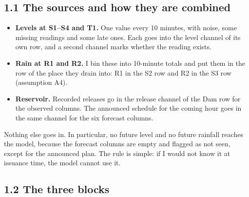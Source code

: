 \documentclass[11pt,letterpaper]{article}
\begin{document}
\subsection*{1.1 The sources and how they are combined}

\begin{itemize}
\item \textbf{Levels at S1--S4 and T1.} One value every 10 minutes, with noise,
some missing readings and some late ones. Each goes into the level channel of its
own row, and a second channel marks whether the reading exists.
\item \textbf{Rain at R1 and R2.} I bin these into 10-minute totals and put them
in the row of the place they drain into: R1 in the S2 row and R2 in the S3 row
(assumption A4).
\item \textbf{Reservoir.} Recorded releases go in the release channel of the Dam
row for the observed columns. The announced schedule for the coming hour goes in
the same channel for the six forecast columns.
\end{itemize}

Nothing else goes in. In particular, no future level and no future rainfall
reaches the model, because the forecast columns are empty and flagged as not
seen, except for the announced plan. The rule is simple: if I would not know it
at issuance time, the model cannot use it.

\subsection*{1.2 The three blocks}
\end{document}
